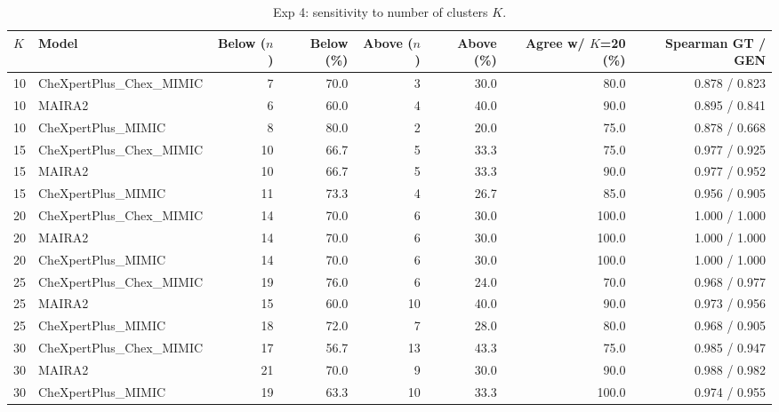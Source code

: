 \begin{table}[t]
\centering
\footnotesize
\caption{Exp 4: sensitivity to number of clusters $K$.}
\label{tab:supp_exp4_part1}
\begin{tabular}{llrrrrrr}
\toprule
$K$ & Model & Below ($n$) & Below (\%) & Above ($n$) & Above (\%) & Agree w/ $K$=20 (\%) & Spearman GT / GEN \\
\midrule
10 & CheXpertPlus\_Chex\_MIMIC & 7 & 70.0 & 3 & 30.0 & 80.0 & 0.878 / 0.823 \\
10 & MAIRA2 & 6 & 60.0 & 4 & 40.0 & 90.0 & 0.895 / 0.841 \\
10 & CheXpertPlus\_MIMIC & 8 & 80.0 & 2 & 20.0 & 75.0 & 0.878 / 0.668 \\
15 & CheXpertPlus\_Chex\_MIMIC & 10 & 66.7 & 5 & 33.3 & 75.0 & 0.977 / 0.925 \\
15 & MAIRA2 & 10 & 66.7 & 5 & 33.3 & 90.0 & 0.977 / 0.952 \\
15 & CheXpertPlus\_MIMIC & 11 & 73.3 & 4 & 26.7 & 85.0 & 0.956 / 0.905 \\
20 & CheXpertPlus\_Chex\_MIMIC & 14 & 70.0 & 6 & 30.0 & 100.0 & 1.000 / 1.000 \\
20 & MAIRA2 & 14 & 70.0 & 6 & 30.0 & 100.0 & 1.000 / 1.000 \\
20 & CheXpertPlus\_MIMIC & 14 & 70.0 & 6 & 30.0 & 100.0 & 1.000 / 1.000 \\
25 & CheXpertPlus\_Chex\_MIMIC & 19 & 76.0 & 6 & 24.0 & 70.0 & 0.968 / 0.977 \\
25 & MAIRA2 & 15 & 60.0 & 10 & 40.0 & 90.0 & 0.973 / 0.956 \\
25 & CheXpertPlus\_MIMIC & 18 & 72.0 & 7 & 28.0 & 80.0 & 0.968 / 0.905 \\
30 & CheXpertPlus\_Chex\_MIMIC & 17 & 56.7 & 13 & 43.3 & 75.0 & 0.985 / 0.947 \\
30 & MAIRA2 & 21 & 70.0 & 9 & 30.0 & 90.0 & 0.988 / 0.982 \\
30 & CheXpertPlus\_MIMIC & 19 & 63.3 & 10 & 33.3 & 100.0 & 0.974 / 0.955 \\
\bottomrule
\end{tabular}
\end{table}

